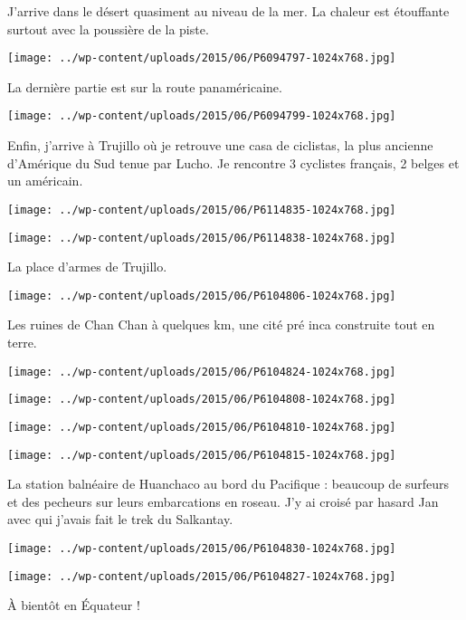 J'arrive dans le désert quasiment au niveau de la mer. La chaleur est étouffante surtout avec la poussière de la piste. 
\begin{center} \texttt{[image: ../wp-content/uploads/2015/06/P6094797-1024x768.jpg]} \end{center}

\pagebreak
La dernière partie est sur la route panaméricaine. 
\begin{center} \texttt{[image: ../wp-content/uploads/2015/06/P6094799-1024x768.jpg]} \end{center}

Enfin, j'arrive à Trujillo où je retrouve une casa de ciclistas, la plus ancienne d'Amérique du Sud tenue par Lucho. Je rencontre 3 cyclistes français, 2 belges et un américain. 
\begin{center} \texttt{[image: ../wp-content/uploads/2015/06/P6114835-1024x768.jpg]} \end{center}
\begin{center} \texttt{[image: ../wp-content/uploads/2015/06/P6114838-1024x768.jpg]} \end{center}

La place d'armes de Trujillo. 
\begin{center} \texttt{[image: ../wp-content/uploads/2015/06/P6104806-1024x768.jpg]} \end{center}

\pagebreak
Les ruines de Chan Chan à quelques km, une cité pré inca construite tout en terre. 
\begin{center} \texttt{[image: ../wp-content/uploads/2015/06/P6104824-1024x768.jpg]} \end{center}
\begin{center} \texttt{[image: ../wp-content/uploads/2015/06/P6104808-1024x768.jpg]} \end{center}
\begin{center} \texttt{[image: ../wp-content/uploads/2015/06/P6104810-1024x768.jpg]} \end{center}
\begin{center} \texttt{[image: ../wp-content/uploads/2015/06/P6104815-1024x768.jpg]} \end{center}

\pagebreak
La station balnéaire de Huanchaco au bord du Pacifique : beaucoup de surfeurs et des pecheurs sur leurs embarcations en roseau. J'y ai croisé par hasard Jan avec qui j'avais fait le trek du Salkantay. 
\begin{center} \texttt{[image: ../wp-content/uploads/2015/06/P6104830-1024x768.jpg]} \end{center}
\begin{center} \texttt{[image: ../wp-content/uploads/2015/06/P6104827-1024x768.jpg]} \end{center}

\`A bientôt en Équateur !